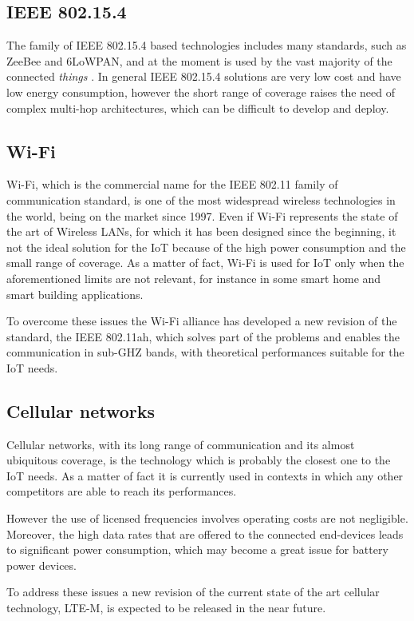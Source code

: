 \subsection{IEEE 802.15.4}
The family of IEEE 802.15.4 based technologies includes many standards, such as ZeeBee and 6LoWPAN, and at the moment is used by the vast majority of the connected \emph{things} \cite{centenaro}. In general IEEE 802.15.4 solutions are very low cost and have low energy consumption, however the short range of coverage raises the need of complex multi-hop architectures, which can be difficult to develop and deploy.

\subsection{Wi-Fi}
Wi-Fi, which is the commercial name for the IEEE 802.11 family of communication standard, is one of the most widespread wireless technologies in the world, being on the market since 1997. Even if Wi-Fi represents the state of the art of Wireless LANs, for which it has been designed since the beginning, it not the ideal solution for the IoT because of the high power consumption and the small range of coverage. As a matter of fact, Wi-Fi is used for IoT only when the aforementioned limits are not relevant, for instance in some smart home and smart building applications.

To overcome these issues the Wi-Fi alliance has developed a new revision of the standard, the IEEE 802.11ah, which solves part of the problems and enables the communication in sub-GHZ bands, with theoretical performances suitable for the IoT needs.

\subsection{Cellular networks}
Cellular networks, with its long range of communication and its almost ubiquitous coverage, is the technology which is probably the closest one to the IoT needs. As a matter of fact it is currently used in contexts in which any other competitors are able to reach its performances. 

However the use of licensed frequencies involves operating costs are not negligible. Moreover, the high data rates that are offered to the connected end-devices leads to significant power consumption, which may become a great issue for battery power devices.

To address these issues a new revision of the current state of the art cellular technology, LTE-M, is expected to be released in the near future.

